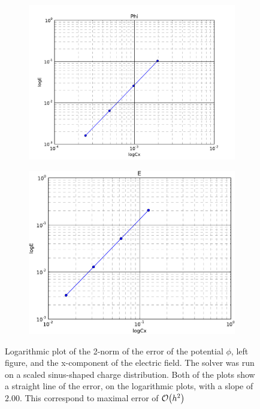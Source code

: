 \begin{figure}
    \centering
    \begin{subfigure}[b]{0.49\textwidth}
        \includegraphics[width = \textwidth]{figures/verification/errorScaling/errorloglog}

    \end{subfigure}
    \begin{subfigure}[b]{0.49\textwidth}
        \includegraphics[width = \textwidth]{figures/verification/errorScaling/errorEloglog}
    \end{subfigure}
    \caption{Logarithmic plot of the 2-norm of the error of the potential \(\phi\), left figure, and the
    x-component of the electric field. The solver was run on a scaled sinus-shaped charge distribution.
    Both of the plots show a straight line of the error, on the logarithmic plots, with a slope
    of \(2.00\). This correspond to maximal error of \(\order{h^2}\)}
\end{figure}
